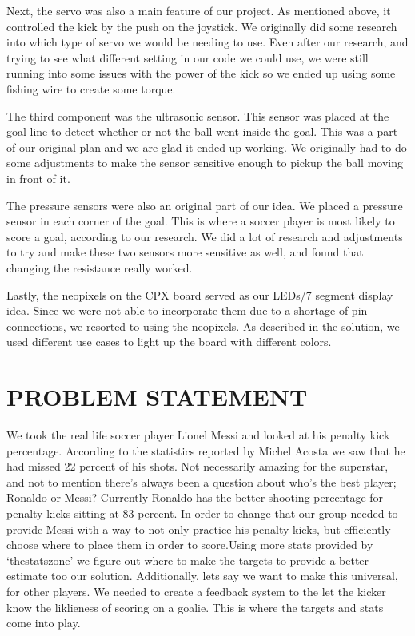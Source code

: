 \documentclass[12pt]{article}
\begin{document}
Next, the servo was also a main feature of our project. As mentioned above, it controlled the kick by the push on the joystick. We originally did some research into which type of servo we would be needing to use. Even after our research, and trying to see what different setting in our code we could use, we were still running into some issues with the power of the kick so we ended up using some fishing wire to create some torque. 

The third component was the ultrasonic sensor. This sensor was placed at the goal line to detect whether or not the ball went inside the goal. This was a part of our original plan and we are glad it ended up working. We originally had to do some adjustments to make the sensor sensitive enough to pickup the ball moving in front of it. 

The pressure sensors were also an original part of our idea. We placed a pressure sensor in each corner of the goal. This is where a soccer player is most likely to score a goal, according to our research. We did a lot of research and adjustments to try and make these two sensors more sensitive as well, and found that changing the resistance really worked. 

Lastly, the neopixels on the CPX board served as our LEDs/7 segment display idea. Since we were not able to incorporate them due to a shortage of pin connections, we resorted to using the neopixels. As described in the solution, we used different use cases to light up the board with different colors. 


\section{PROBLEM STATEMENT}
We took the real life soccer player Lionel Messi and looked at his penalty kick percentage. According to the statistics reported by Michel Acosta\cite{michelacosta} we saw that he had missed 22 percent of his shots. Not necessarily amazing for the superstar, and not to mention there's always been a question about who's the best player; Ronaldo or Messi? Currently Ronaldo has the better shooting percentage for penalty kicks sitting at 83 percent. In order to change that our group needed to provide Messi with a way to not only practice his penalty kicks, but efficiently choose where to place them in order to score.Using more stats provided by `thestatszone'\cite{StatsZone.com} we figure out where to make the targets to provide a better estimate too our solution. Additionally, lets say we want to make this universal, for other players. We needed to create a feedback system to the let the kicker know the liklieness of scoring on a goalie. This is where the targets and stats come into play.
\end{document}
